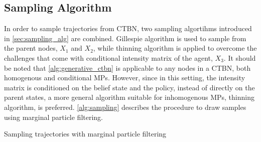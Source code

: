\subsection{Sampling Algorithm}
In order to sample trajectories from CTBN, two sampling algortihms introduced in \cref{sec:sampling_alg} are combined. Gillespie algorithm is used to sample from the parent nodes, $ X_1 $ and $ X_2 $, while thinning algorithm is applied to overcome the challenges that come with conditional intensity matrix of the agent, $ X_3 $. It should be noted that \cref{alg:generative_ctbn} is applicable to any nodes in a CTBN, both homogenous and conditional MPs. However, since in this setting, the intensity matrix is conditioned on the belief state and the policy, instead of directly on the parent states, a more general algorithm suitable for inhomogenous MPs, thinning algorithm, is preferred. \cref{alg:sampling} describes the procedure to draw samples using marginal particle filtering. \\
\begin{algorithm}[H]
	
	
	\begin{algorithmic}[1]
			 
		 
		 \footnotemark
		\ENDWHILE
		\ENDWHILE
	\end{algorithmic}
	\caption{Sampling trajectories with marginal particle filtering}
	\label{alg:sampling}
\end{algorithm}
